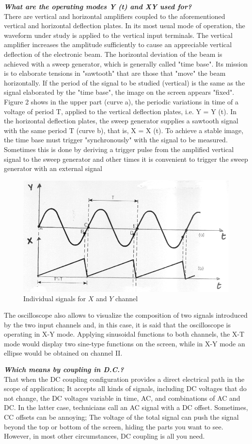 \documentclass[letterpaper]{article}
\begin{document}
\textit{\textbf{What are the operating modes Y (t) and XY used for?}}\\
There are vertical and horizontal amplifiers coupled to the aforementioned vertical and horizontal
deflection plates. In its most usual mode of operation, the waveform under study is applied to the
vertical input terminals. The vertical amplifier increases the amplitude sufficiently to cause an
appreciable vertical deflection of the electronic beam. The horizontal deviation of the beam is
achieved with a sweep generator, which is generally called "time base". Its mission is to elaborate
tensions in "sawtooth" that are those that "move" the beam horizontally. If the period of the signal
to be studied (vertical) is the same as the signal elaborated by the "time base", the image on the
screen appears "fixed". Figure 2 shows in the upper part (curve a), the periodic variations in time
of a voltage of period T, applied to the vertical deflection plates, i.e. Y = Y (t). In the horizontal deflection plates, the sweep generator supplies a sawtooth signal with the same period T (curve b), that is, X = X (t). To achieve a stable image, the time base must trigger "synchronously" with the signal to be measured. Sometimes this is done by deriving a trigger pulse from the amplified vertical signal to the sweep generator and other times it is convenient to trigger the sweep generator with an external signal
\begin{figure}[H]
    \centering
    \includegraphics[width=.4\linewidth]{img/intro/waves}
    \caption{Individual signals for $X$ and $Y$ channel}
\end{figure}
The oscilloscope also allows to visualize the composition of two signals introduced by the two input channels and, in this case, it is said that the oscilloscope is operating in X-Y mode. Applying sinusoidal functions to both channels, the X-T mode would display two sine-type functions on the screen, while in X-Y mode an ellipse would be obtained on channel II.


\textit{\textbf{Which means by coupling in D.C.?}}\\
That when the DC coupling configuration provides a direct electrical path in the scope of application; It accepts all kinds of signals, including DC voltages that do not change, the DC voltages variable in time, AC, and combinations of AC and DC. In the latter case, technicians call an AC signal with a DC offset. Sometimes, CC offsets can be annoying; The voltage of the total signal can push the signal beyond the top or bottom of the screen, hiding the parts you want to see. However, in most other circumstances, DC coupling is all you need.
\end{document}
